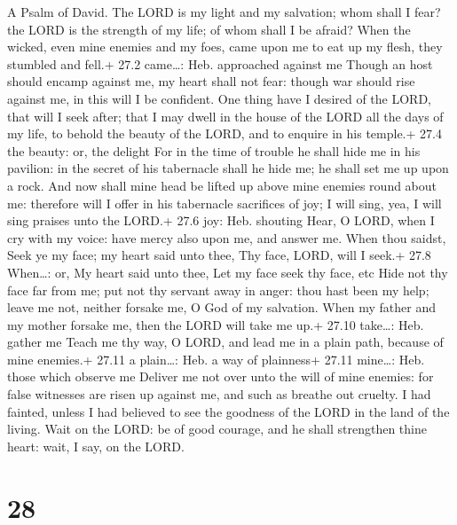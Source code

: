 A Psalm of David.  The LORD is my light and my salvation;
whom shall I fear? the LORD is the strength of my life; of whom shall I
be afraid?  When the wicked, even mine enemies and my foes,
came upon me to eat up my flesh, they stumbled and fell.+ 27.2
came\ldots: Heb. approached against me  Though an host
should encamp against me, my heart shall not fear: though war should
rise against me, in this will I be confident.  One thing
have I desired of the LORD, that will I seek after; that I may dwell in
the house of the LORD all the days of my life, to behold the beauty of
the LORD, and to enquire in his temple.+ 27.4 the beauty: or, the
delight  For in the time of trouble he shall hide me in his
pavilion: in the secret of his tabernacle shall he hide me; he shall set
me up upon a rock.  And now shall mine head be lifted up
above mine enemies round about me: therefore will I offer in his
tabernacle sacrifices of joy; I will sing, yea, I will sing praises unto
the LORD.+ 27.6 joy: Heb. shouting  Hear, O LORD, when I cry
with my voice: have mercy also upon me, and answer me.  When
thou saidst, Seek ye my face; my heart said unto thee, Thy face, LORD,
will I seek.+ 27.8 When\ldots: or, My heart said unto thee, Let my face
seek thy face, etc  Hide not thy face far from me; put not
thy servant away in anger: thou hast been my help; leave me not, neither
forsake me, O God of my salvation.  When my father and my
mother forsake me, then the LORD will take me up.+ 27.10 take\ldots:
Heb. gather me  Teach me thy way, O LORD, and lead me in a
plain path, because of mine enemies.+ 27.11 a plain\ldots: Heb. a way of
plainness+ 27.11 mine\ldots: Heb. those which observe me 
Deliver me not over unto the will of mine enemies: for false witnesses
are risen up against me, and such as breathe out cruelty. 
I had fainted, unless I had believed to see the goodness of the LORD in
the land of the living.  Wait on the LORD: be of good
courage, and he shall strengthen thine heart: wait, I say, on the LORD.

\hypertarget{section-27}{%
\section{28}\label{section-27}}

